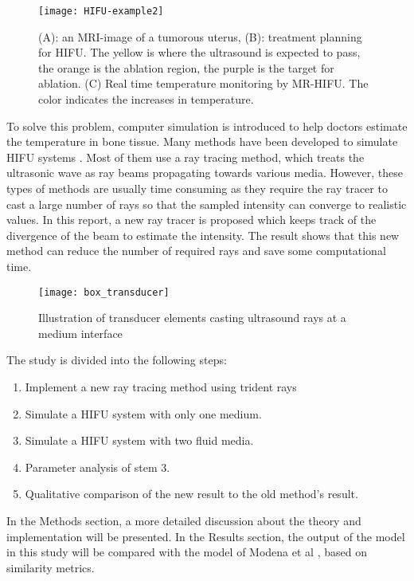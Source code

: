 \begin{figure}[h]
    \centering
    \texttt{[image: HIFU-example2]}
    \caption{(A): an MRI-image of a tumorous uterus, (B): treatment planning for HIFU. The yellow is where the ultrasound is expected to pass, the orange is the ablation region, the purple is the target for ablation. (C) Real time temperature monitoring by MR-HIFU. The color indicates the increases in temperature. \cite{vanwijk2013}}
    \label{fig:HIFU_example}
\end{figure}

To solve this problem, computer simulation is introduced to help doctors estimate the temperature in bone tissue. Many methods have been developed to simulate HIFU systems \cite{StochasticSim}. Most of them use a ray tracing method, which treats the ultrasonic wave as ray beams propagating towards various media. However, these types of methods are usually time consuming as they require the ray tracer to cast a large number of rays so that the sampled intensity can converge to realistic values. In this report, a new ray tracer is proposed which keeps track of the divergence of the beam to estimate the intensity. The result shows that this new method can reduce the number of required rays and save some computational time.

\begin{figure}[h]
    \centering
    \texttt{[image: box\_transducer]}
    \caption{Illustration of transducer elements casting ultrasound rays at a medium interface}
    \label{fig:transducer_coordinates}
\end{figure}

The study is divided into the following steps:

\begin{enumerate}
    \item Implement a new ray tracing method using trident rays
    \item Simulate a HIFU system with only one medium.
    \item Simulate a HIFU system with two fluid media.
    \item Parameter analysis of stem 3.
    \item Qualitative comparison of the new result to the old method's result.
\end{enumerate}

In the Methods section, a more detailed discussion about the theory and implementation will be presented. In the Results section, the output of the model in this study will be compared with the model of Modena et al \cite{Modena_2018}, based on similarity metrics.
